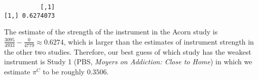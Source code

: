 \documentclass[
  12pt,
  leqno]{article}
\newenvironment{Shaded}{\begin{snugshade}}{\end{snugshade}}
\newcommand{\DecValTok}[1]{\textcolor[rgb]{0.00,0.00,0.81}{#1}}
\newcommand{\KeywordTok}[1]{\textcolor[rgb]{0.13,0.29,0.53}{\textbf{#1}}}
\newcommand{\NormalTok}[1]{#1}
\newcommand{\OperatorTok}[1]{\textcolor[rgb]{0.81,0.36,0.00}{\textbf{#1}}}
\newcommand{\StringTok}[1]{\textcolor[rgb]{0.31,0.60,0.02}{#1}}
\DeclareMathOperator{\1}{\mathbbm{1}}
\begin{document}
\begin{Shaded}
\end{Shaded}

\begin{verbatim}
          [,1]
[1,] 0.6274073
\end{verbatim}

\normalsize

The estimate of the strength of the instrument in the Acorn study
\citep{arceneaux2005} is
\(\frac{3095}{4933} - \frac{0}{4779} \approx 0.6274\), which is larger
than the estimates of instrument strength in the other two studies.
Therefore, our best guess of which study has the weakest instrument is
Study 1 (PBS, \textit{Moyers on Addiction: Close to Home}) in which we
estimate \(\pi^C\) to be roughly \(0.3506\).

\newpage

\renewcommand\refname{References}
  
\end{document}
